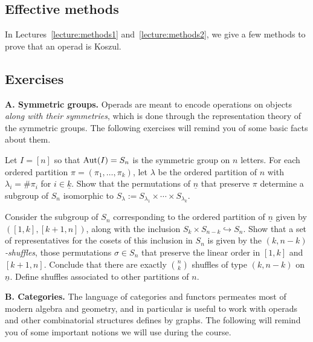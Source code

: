 \subsection{Effective methods}

In Lectures~\ref{lecture:methods1} and~\ref{lecture:methods2}, we give
a few methods to prove that an operad is Koszul.


\newpage

\subsection{Exercises}
 
\textbf{A. Symmetric groups.} Operads are meant to encode
operations on objects \emph{along with their symmetries},
which is done through the representation theory of the
symmetric groups. The following exercises will remind
you of some basic facts about them.


\begin{question} Let $I = [n]$ so that $\operatorname{Aut}(I) = S_n$ is 
the symmetric group on $n$ letters. For each ordered 
partition $\pi = (\pi_1,\ldots,\pi_k)$, let $\lambda$
be the ordered partition of $n$ with $\lambda_i = \# \pi_i$
for $i\in \underline{k}$. Show that the permutations of
$\underline{n}$ that preserve $\pi$ determine a subgroup of $S_n$
isomorphic to $S_\lambda := S_{\lambda_1}\times
\cdots \times S_{\lambda_k}$. 
\end{question}


\begin{question} Consider the subgroup of $S_n$ corresponding
to the ordered partition of $\underline{n}$ given by $([1,k],[k+1,n])$, along with the 
inclusion $S_k\times S_{n-k} \hookrightarrow S_n$. Show that
a set of representatives for the cosets of this inclusion
in $S_n$ is given by the \emph{$(k,n-k)$-shuffles}, those
permutations $\sigma\in S_n$ that preserve the linear order in
$[1,k]$ and $[k+1,n]$. Conclude that there are exactly
$\binom nk$ shuffles of type $(k,n-k)$ on $\underline{n}$. Define
shuffles associated to other partitions of $n$.
\end{question}

\medskip
\textbf{B. Categories.} The language of categories and
functors permeates most of modern algebra and geometry,
and in particular is useful to work with operads and
other combinatorial structures defines by graphs. The
following will remind you of some important notions
we will use during the course.

